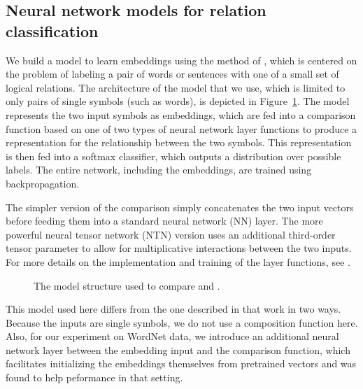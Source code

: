
\subsection*{Neural network models for relation classification} \label{methods}

We build a model to learn embeddings using the method of
\citet{Bowman:Potts:Manning:2014}, which is centered on the problem of
labeling a pair of words or sentences with one of a small set of
logical relations. The architecture of the model that we use, which is
limited to only pairs of single symbols (such as words), is depicted
in Figure~\ref{sample-figure}. The model represents the two input
symbols as embeddings, which are fed into a comparison function based
on one of two types of neural network layer functions to produce a
representation for the relationship between the two symbols. This
representation is then fed into a softmax classifier, which outputs a
distribution over possible labels. The entire network, including the
embeddings, are trained using backpropagation. 

The simpler version of the comparison simply concatenates the two input
vectors before feeding them into a standard neural network (NN) layer.
The more powerful neural tensor network (NTN) version uses an additional 
third-order tensor parameter to allow for multiplicative
interactions between the two inputs. For more details on the implementation and
training of the layer functions, see \cite{Bowman:Potts:Manning:2014}.

\begin{figure}[tp]
  \centering
  
  \caption{The model structure used to compare  and .} 
  \label{sample-figure}
\end{figure}

This model used here differs from the one described in that work in
two ways. Because the inputs are single symbols, we do not use
a composition function here. Also, for our experiment on WordNet data, 
we introduce an additional neural network layer between the embedding 
input and the comparison function, which facilitates initializing the 
embeddings themselves from pretrained vectors and was found to help 
peformance in that setting.


